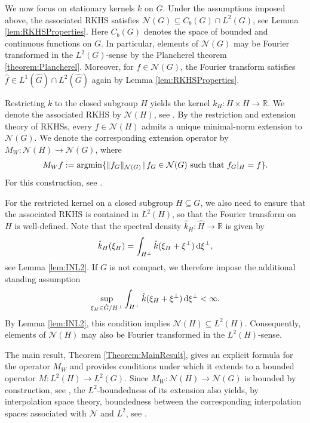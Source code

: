 \documentclass{article}
\renewcommand{\d}{\, \textup{d}}
\newcommand{\R}{\mathbb{R}}
\begin{document}
We now focus on stationary kernels $k$ on $G$. Under the assumptions imposed above, the associated RKHS satisfies $\mathcal{N}(G) \subseteq C_b(G) \cap L^2(G)$, see Lemma \ref{lem:RKHSProperties}. Here $C_b(G)$ denotes the space of bounded and continuous functions on $G$. In particular, elements of $\mathcal{N}(G)$ may be Fourier transformed in the $L^2(G)$-sense by the Plancherel theorem \ref{theorem:Plancherel}. Moreover, for $ f\in \mathcal{N}(G)$, the Fourier transform satisfies $\hat{f} \in L^1(\hat{G}) \cap L^2(\hat{G})$ again by Lemma \ref{lem:RKHSProperties}. 

Restricting $k$ to the closed subgroup $H$ yields the kernel $k_{H}:H \times H \to \R$. We denote the associated RKHS by $\mathcal{N}(H)$, see \cite[Chapter 10.7]{wendland2004scattered}. By the restriction and extension theory of RKHSs, every $f \in \mathcal{N}(H)$ admits a unique minimal-norm extension to $\mathcal{N}(G)$. We denote the corresponding extension operator by $M_W:\mathcal{N}(H) \to \mathcal{N}(G)$, where 
\begin{align}\label{eq:condition}
    M_W f := \textup{argmin} \{ \Vert f_G\Vert_{\mathcal{N}(G)} \, \vert \, f_G \in \mathcal{N}(G) \, \, \textup{such that} \, \, f_G|_H=f \}.
\end{align}
For this construction, see \cite[Theorem 10.46]{wendland2004scattered}. 

For the restricted kernel on a closed subgroup $H\subseteq G$, we also need to ensure that the associated RKHS is contained in $L^2(H)$, so that the Fourier transform on $H$ is well-defined. 
Note that the spectral density $\hat{k}_H:\hat{H} \to \R$ is given by 
\begin{align*}
    \hat{k}_H(\xi_H) = \int_{H^\perp} \hat{k}(\xi_H+\xi^\perp) \d \xi^\perp,
\end{align*}
see Lemma \ref{lem:INL2}.
\color{black}
If $G$ is not compact, we therefore impose the additional standing assumption 
\begin{align}\label{eq:ConditionPrelim}
    \sup_{\xi_H \in \hat{G}/H^\perp} \int_{H^\perp} \hat{k}(\xi_H + \xi^\perp) \d \xi^\perp < \infty.
\end{align}
By Lemma \ref{lem:INL2}, this condition implies $\mathcal{N}(H) \subseteq L^2(H)$. Consequently, elements of $\mathcal{N}(H)$ may also be Fourier transformed in the $L^2(H)$-sense.

The main result, Theorem \ref{Theorem:MainResult}, gives an explicit formula for the operator $M_W$ and provides conditions under which it extends to a bounded operator $M:L^2(H) \to L^2(G)$. Since $M_W:\mathcal{N}(H) \to \mathcal{N}(G)$ is bounded by construction, see  \cite[Theorem 10.46]{wendland2004scattered}, the $L^2$-boundedness of its extension also yields, by interpolation space theory, boundedness between the corresponding interpolation spaces associated with $\mathcal{N}$ and $L^2$, see \cite{bergh1976interpolation}.
\end{document}

